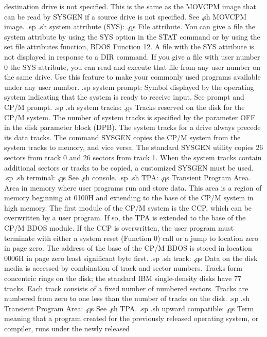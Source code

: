 destination drive is not specified.  This is the same as the 
MOVCPM image that can be read by SYSGEN if a source drive is 
not specified.  See \c
.sh
MOVCPM image.
.sp
.sh
system attribute (SYS):  \c
.qs
File attribute.  You can give a file the system attribute by 
using the SYS option in the STAT command or by using the set file 
attributes function, BDOS Function 12.  A file with the SYS 
attribute is not displayed in response to a DIR command.  If you 
give a file with user number 0 the SYS attribute, you can read 
and execute that file from any user number on the same drive.  
Use this feature to make your commonly used programs available 
under any user number.
.sp
system prompt:
Symbol displayed by the operating system indicating that the 
system is ready to receive input.
See prompt and CP/M prompt.
.sp
.sh
system tracks:  \c
.qs
Tracks reserved on the disk for the CP/M system.  The number of 
system tracks is specified by the parameter OFF in the disk 
parameter block (DPB).  The system tracks for a drive always 
precede its data tracks.  The command SYSGEN copies the CP/M 
system from the system tracks to memory, and vice versa.  The 
standard SYSGEN utility copies 26 sectors from track 0 and 26 
sectors from track 1.  When the system tracks contain additional 
sectors or tracks to be copied, a customized SYSGEN must be used.
.sp
.sh
terminal:  \c
.qs
See \c
.sh
console.
.sp
.sh
TPA:  \c
.qs
Transient Program Area.  Area in memory where user programs run 
and store data.  This area is a region of memory beginning at 
0100H and extending to the base of the CP/M system in high 
memory.  The first module of the CP/M system is the CCP, which 
can be overwritten by a user program.  If so, the TPA is extended 
to the base of the CP/M BDOS module.  If the CCP is overwritten, 
the user program must terminate with either a system reset
(Function 0) call or a jump to location zero in page zero.  The 
address of the base of the CP/M BDOS is stored in location 0006H 
in page zero least significant byte first.
.sp
.sh
track:  \c
.qs
Data on the disk media is accessed by combination of track and 
sector numbers.  Tracks form concentric rings on the disk; the 
standard IBM single-density disks have 77 tracks.  Each track 
consists of a fixed number of numbered sectors.  Tracks are 
numbered from zero to one less than the number of tracks on the 
disk.
.sp
.sh
Transient Program Area:  \c
.qs
See \c
.sh
TPA.
.sp
.sh
upward compatible:  \c
.qs
Term meaning that a program created for the previously released 
operating system, or compiler, runs under the newly released 

